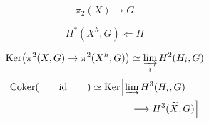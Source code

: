 \[
\pi_2(X)\longrightarrow G
\]

\[
H^*(X^h,G)\Longleftarrow H
\]

\[
\operatorname{Ker}\bigl(\pi^2(X,G)\to\pi^2(X^h,G)\bigr)\simeq\varinjlim_i H^2(H_i,G)
\]
\[
\begin{aligned}
\operatorname{Coker}(\qquad\mathrm{id}\qquad)&\simeq\operatorname{Ker}\Bigl[\varinjlim H^3(H_i,G)\\
&\hspace{4em}\longrightarrow H^3(\widetilde X,G)\Bigr]
\end{aligned}
\]

